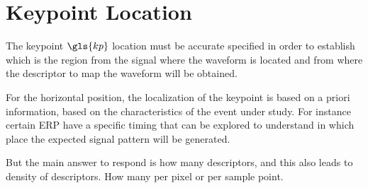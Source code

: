 

\section{Keypoint Location}

The keypoint $\gls{kp}$ location must be accurate specified in order to establish which is the region from the signal where the waveform is located and from where the descriptor to map the waveform will be obtained.

For the horizontal position, the localization of the keypoint is based on a priori information, based on the characteristics of the event under study.  For instance certain ERP have a specific timing that can be explored to understand in which place the expected signal pattern will be generated.

But the main answer to respond is how many descriptors, and this also leads to density of descriptors.  How many per pixel or per sample point.

